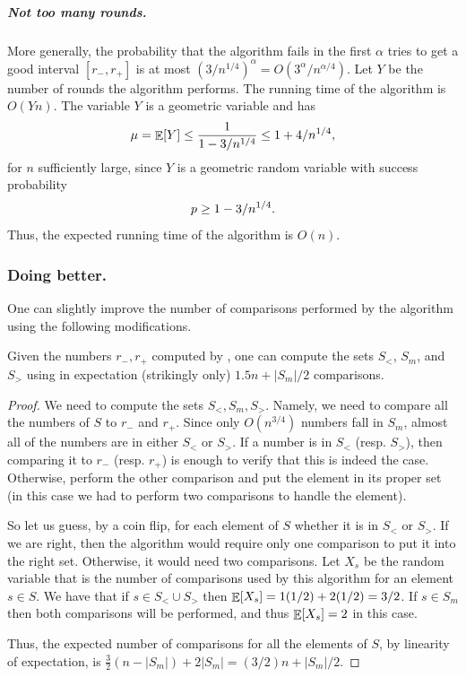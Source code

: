 \subparagraph*{Not too many rounds.}

More generally, the probability that the algorithm fails in the first
$\alpha$ tries to get a good interval $[r_{-}, r_{+}]$ is at most
$(3/n^{1/4})^\alpha = O(3^\alpha /n^{\alpha /4})$. Let $Y$ be the number
of rounds the algorithm performs. The running time of the algorithm is
$ O(Yn)$.  The variable $Y$ is a geometric variable and has
\begin{equation}
    \mu = \Ex{Y} \leq  \frac{1}{  1- 3/n^{1/4}} \leq 1 + 4/n^{1/4},
    \eqlab{q-s-few-rounds}
\end{equation}
for $n$ sufficiently large, since $Y$ is a geometric random variable with
success probability
\begin{equation}
    p \geq 1 - 3/n^{1/4}.
    \eqlab{s-p-r-selection}
\end{equation}
Thus, the expected running time of the algorithm is $O(n)$.

\subsubsection{Doing better.}

One can slightly improve the number of comparisons performed by the
algorithm using the following modifications.
\begin{lemma}
    Given the numbers $r_{-}, r_{+}$ computed by ,
    one can compute the sets $S_<$, $S_m$, and $S_>$ using in expectation
    (strikingly only) $1.5n + |S_m|/2$ comparisons.
\end{lemma}
\begin{proof}
    We need to compute the sets $S_{<}, S_m, S_>$. Namely, we need to
    compare all the numbers of $S$ to $r_{-}$ and $r_{+}$. Since only
    $O(n^{3/4})$ numbers fall in $S_m$, almost all of the numbers are in
    either $S_<$ or $S_>$. If a number is in $S_<$ (resp. $S_>$), then
    comparing it to $r_-$ (resp. $r_+$) is enough to verify that this is
    indeed the case. Otherwise, perform the other comparison and put the
    element in its proper set (in this case we had to perform two
    comparisons to handle the element).

    So let us guess, by a coin flip, for each element of $S$ whether it
    is in $S_<$ or $S_>$. If we are right, then the algorithm would
    require only one comparison to put it into the right set. Otherwise,
    it would need two comparisons. Let $X_s$ be the random variable that
    is the number of comparisons used by this algorithm for an element
    $s \in S$. We have that if $s \in S_< \cup S_>$ then
    $\mathop{\mathbb{E}}\!\left[ {X_s} \right] = 1(1/2) + 2(1/2) = 3/2$. If $s \in S_m$ then both
    comparisons will be performed, and thus $\mathop{\mathbb{E}}\!\left[ {X_s} \right]=2$ in this case.

    Thus, the expected number of comparisons for all the elements of $S$,
    by linearity of expectation, is
    $\tfrac{3}{2}(n-|S_m|) + 2 |S_m| = (3/2)n + |S_m|/2$.
\end{proof}


